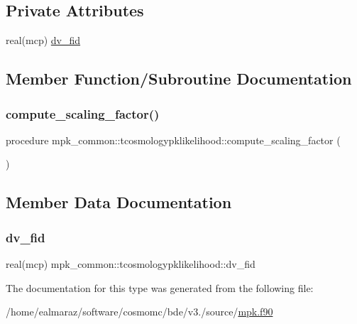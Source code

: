 \subsection*{Private Attributes}
\begin{DoxyCompactItemize}
\item 
real(mcp) \mbox{\hyperlink{structmpk__common_1_1tcosmologypklikelihood_a3ef4a0561ffb1d3584ea70e4697e06a3}{dv\+\_\+fid}}
\end{DoxyCompactItemize}


\subsection{Member Function/\+Subroutine Documentation}
\mbox{\label{structmpk__common_1_1tcosmologypklikelihood_a2d3f108d2221aed0b2a07d7ef4e61b5b}} 
\subsubsection{\texorpdfstring{compute\+\_\+scaling\+\_\+factor()}{compute\_scaling\_factor()}}
{\footnotesize\ttfamily procedure mpk\+\_\+common\+::tcosmologypklikelihood\+::compute\+\_\+scaling\+\_\+factor (\begin{DoxyParamCaption}{ }\end{DoxyParamCaption})\hspace{0.3cm}{\ttfamily [private]}}



\subsection{Member Data Documentation}
\mbox{\label{structmpk__common_1_1tcosmologypklikelihood_a3ef4a0561ffb1d3584ea70e4697e06a3}} 
\subsubsection{\texorpdfstring{dv\+\_\+fid}{dv\_fid}}
{\footnotesize\ttfamily real(mcp) mpk\+\_\+common\+::tcosmologypklikelihood\+::dv\+\_\+fid\hspace{0.3cm}{\ttfamily [private]}}



The documentation for this type was generated from the following file\+:\begin{DoxyCompactItemize}
\item 
/home/ealmaraz/software/cosmomc/bde/v3./source/\mbox{\hyperlink{mpk_8f90}{mpk.\+f90}}\end{DoxyCompactItemize}
